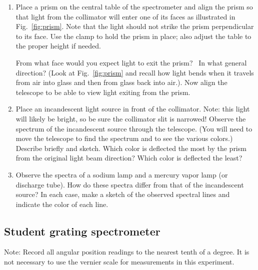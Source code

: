 \documentclass{article}
\begin{document}
\begin{enumerate}
\item Place a prism on the central table of the spectrometer and align
the prism so that light from the collimator will enter one of its faces
as illustrated in Fig.~\ref{fig:prism}.  Note that the light should not strike the
prism perpendicular to its face. Use the clamp to hold the prism in
place; also adjust the table to the proper height if needed. 


From what face would you expect light to exit the prism? \ In what
general direction? (Look at Fig.~\ref{fig:prism} and recall how light bends when it
travels from air into glass and then from glass back into air.). Now
align the telescope to be able to view light exiting from the prism.

\item Place an incandescent light source in front of the collimator.
Note: this light will likely be bright, so be sure the collimator slit
is narrowed! Observe the spectrum of the incandescent source through
the telescope.   (You will need to move the telescope to find the
spectrum and to see the various colors.)  Describe briefly and sketch.
 Which color is deflected the most by the prism from the original
light beam direction?  Which color is deflected the least? 

\item Observe the spectra of a sodium lamp and a mercury vapor lamp (or
discharge tube). How do these spectra differ from that of the
incandescent source? In each case, make a sketch of the observed
spectral lines and indicate the color of each line.
\end{enumerate}

\subsection{Student grating spectrometer}
Note:  Record all angular position readings to the nearest tenth of a
degree.  It is not necessary to use the vernier scale for measurements
in this experiment.
\end{document}
